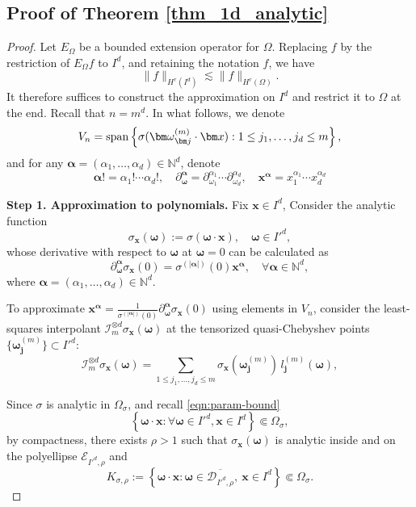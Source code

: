 \documentclass{article}
\numberwithin{equation}{section}
\def\NN{\mathbb{N}}
\def\lt{\left}
\def\rt{\right}
\def\bomega{{\bm\omega}}
\def\balpha{{\bm\alpha}}
\def\bx{{\bm x}}
\def\bj{{\bm j}}
\begin{document}
\subsection{Proof of Theorem \ref{thm_1d_analytic}}
\begin{proof}
    Let $E_\Omega$ be a bounded extension operator for $\Omega$. Replacing $f$ by the restriction of $E_\Omega f$ to $I^d$, and retaining the notation $f$, we have
    $$
        \|f\|_{H^r(I^d)}\lesssim \|f\|_{H^r(\Omega)}.
    $$
    It therefore suffices to construct the approximation on $I^d$ and restrict it to $\Omega$ at the end.
    Recall that $n=m^d$. In what follows, we denote 
    $$V_n = {\rm span}\lt\{ \sigma(\bomega_\bj^{(m)}\cdot \bx):1\leq j_1,\ldots,j_d\leq m\rt\},$$ 
    and for any $\balpha = (\alpha_1,\ldots,\alpha_d)\in\NN^d$, denote
    $$
    \balpha! = \alpha_1!\cdots\alpha_d!, \quad
    \partial_\bomega^\balpha = \partial_{\omega_1}^{\alpha_1}\cdots \partial_{\omega_d}^{\alpha_d},\quad 
    \bx^\balpha = x_1^{\alpha_1}\cdots x_d^{\alpha_d}$$ 
    
    
    \textbf{Step 1. Approximation to polynomials.} 
    Fix $\bx\in I^d$, Consider the analytic function 
    $$\sigma_\bx(\bomega):=\sigma(\bomega\cdot\bx), \quad\bomega\in I'^d,$$
    whose derivative with respect to $\bomega$ at $\bomega=0$ can be calculated as
    \begin{equation}\label{eqn:derivative-of-sigmax}
        \partial_\bomega^\balpha \sigma_\bx(0) =  \sigma^{(|\balpha|)}(0)\bx^\balpha,\quad\forall \balpha\in\NN^d,
    \end{equation}
    where $\balpha = (\alpha_1,\ldots,\alpha_d)\in\NN^d$. 
    
    To approximate 
        $\bx^\balpha = \frac{1}{\sigma^{(|\balpha|)}(0)}\partial_\bomega ^\balpha \sigma_\bx(0)$
    using elements in $V_n$, consider the least-squares interpolant $\mathcal I_m ^{\otimes d} \sigma_\bx(\bomega)$ at the tensorized quasi-Chebyshev points $\{\bomega_\bj^{(m)}\}\subset I'^d$: 
    $$\mathcal I_m^{\otimes d} \sigma_\bx(\bomega) = \sum_{1\leq j_1,\ldots,j_d\leq m} \sigma_\bx(\bomega_\bj^{(m)})\,l_\bj^{(m)}(\bomega),$$
    
    Since $\sigma$ is analytic in $\Omega_\sigma$, and recall \eqref{eqn:param-bound}   
    $$
        \lt\{{\bm\omega}\cdot {\bm x}: \forall{\bm\omega}\in I'^d,{\bm x}\in I^d \rt\}\Subset \Omega_\sigma,
    $$
    by compactness, there exists $\rho>1$ such that $\sigma_\bx(\bomega)$ is analytic inside and on the polyellipse $\mathcal{E}_{I'^d,\rho}$ and
    $$
        K_{\sigma,\rho}:=
        \lt\{{\bm\omega}\cdot {\bm x}: {\bm\omega}\in \overline{\mathcal D_{I'^d,\rho}},\ {\bm x}\in I^d \rt\}\Subset \Omega_\sigma.
    $$ 
    

\end{proof}
\end{document}
